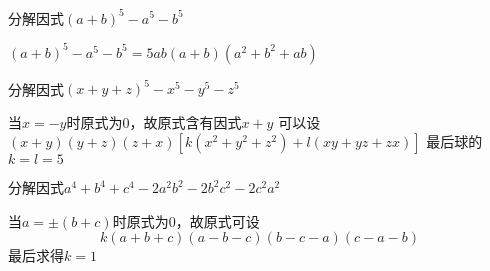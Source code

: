 \documentclass[windows,csize4]{BHCexam}
\begin{document}
\begin{groups}
\begin{questions}[]
        \question[5] 分解因式$(a+b)^5-a^5-b^5$
        \begin{solution}{0.5cm}
            \methodonly $(a+b)^5-a^5-b^5=5ab(a+b)(a^2+b^2+ab)$
        \end{solution}
        \vspace{3.5cm}

        \question[5] 分解因式$(x+y+z)^5-x^5-y^5-z^5$
        \begin{solution}{0.5cm}
            \methodonly 当$x=-y$时原式为$0$，故原式含有因式$x+y$
            可以设$(x+y)(y+z)(z+x)[k(x^2+y^2+z^2)+l(xy+yz+zx)]$ 最后球的$k=l=5$
        \end{solution}
        \vspace{3.5cm}

        \question[5] 分解因式$a^4+b^4+c^4-2a^2b^2-2b^2c^2-2c^2a^2$
        \begin{solution}{0.5cm}
            \methodonly 当$a=\pm(b+c)$时原式为$0$，故原式可设
            \[
                k(a+b+c)(a-b-c)(b-c-a)(c-a-b)
            \]
            最后求得$k=1$
        \end{solution}
    \end{questions}

\end{groups}


\label{lastpage}
\end{document}
